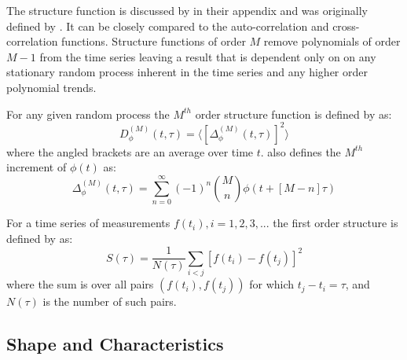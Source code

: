 \documentclass[12pt, oneside]{smuthesis}
\begin{document}
The structure function is discussed by \citep{cordes1985} in their appendix and was originally defined by \citep{rutman}. It can be closely compared to the auto-correlation and cross-correlation functions. Structure functions of order $M$ remove polynomials of order $M-1$ from the time series leaving a result that is dependent only on on any stationary random process inherent in the time series and any higher order polynomial trends.

For any given random process the $M^{th}$ order structure function is defined by \cite{rutman} as:
\begin{equation} \label{eqn3.1}
D^{\left(M\right)}_{\phi}\left(t, \tau\right) = \langle\left[\Delta^{\left(M\right)}_{\phi}\left(t, \tau\right)\right]^{2}\rangle
\end{equation}
where the angled brackets are an average over time $t$. \cite{rutman} also defines the $M^{th}$ increment of $\phi\left(t\right)$ as:
\begin{equation} \label{eqn3.2}
\Delta^{\left(M\right)}_{\phi}\left(t, \tau\right) = \sum_{n=0}^{\infty}\left(-1\right)^{n}{M \choose n}\phi\left(t + \left[M - n\right]\tau\right)
\end{equation}

For a time series of measurements $f\left(t_{i}\right), i = 1,2,3,...$ the first order structure is defined by \citep{collier2001} as:
\begin{equation}
S\left(\tau\right) = \frac{1}{N\left(\tau\right)}\sum_{i<j}\left[f\left(t_{i}\right)-f\left(t_{j}\right)\right]^{2}
\end{equation}
where the sum is over all pairs $\left(f\left(t_{i}\right),f\left(t_{j}\right)\right)$ for which $t_{j}-t_{i}=\tau$, and $N\left(\tau\right)$ is the number of such pairs.

\subsection{\sc Shape and Characteristics} \label{shapeAndCharacteristics}
\end{document}
